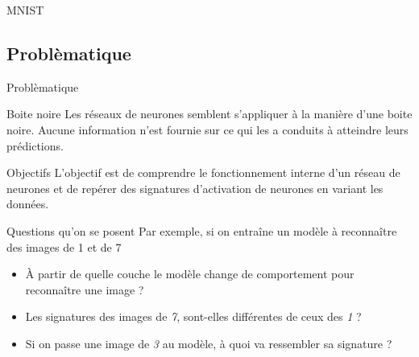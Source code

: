 \documentclass[10pt,handout]{beamer}
\newif\ifplacelogo %
\begin{document}
\begin{frame}{MNIST}
\end{frame}
\placelogotrue

\placelogofalse 
\subsection{Problèmatique}
\begin{frame}{Problèmatique}
    \begin{block}{Boite noire}
        Les réseaux de neurones semblent s'appliquer à la manière d'une boite noire. Aucune information n'est fournie sur ce qui les a conduits à atteindre leurs prédictions.
    \end{block}
    \begin{block}{Objectifs}
        L'objectif est de comprendre le fonctionnement interne d'un réseau de neurones et de repérer des signatures d'activation de neurones en variant les données.
    \end{block}

        
\end{frame}
\placelogotrue

\begin{frame}{Questions qu'on se posent}
    Par exemple, si on entraîne un modèle à reconnaître des images de 1 et de 7
    \begin{itemize}
        \item À partir de quelle couche le modèle change de comportement pour reconnaître une image ?
        \item Les signatures des images de \textit{7}, sont-elles différentes de ceux des \textit{1} ?
        \item Si on passe une image de \textit{3} au modèle, à quoi va ressembler sa signature ?
    \end{itemize}    
\end{frame}
\end{document}
